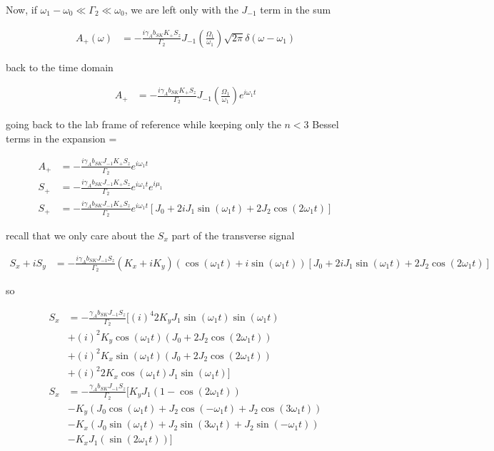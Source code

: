 \documentclass{article}
\begin{document}
Now, if $\omega_1-\omega_0\ll\Gamma_2\ll\omega_0$, we are left only with the $J_{-1}$ term in the sum

\begin{align}
      A_+\left(\omega\right)&= -\frac{i \gamma_{A}b_{SK}K_+ S_z}{\Gamma_2} J_{-1}\left(\frac{\Omega_1}{\omega_1}\right)\sqrt{2\pi} \delta\left(\omega - \omega_1\right)
\end{align}

back to the time domain

\begin{align}
      A_+ &= -\frac{i \gamma_{A}b_{SK}K_+ S_z}{\Gamma_2} J_{-1}\left(\frac{\Omega_1}{\omega_1}\right)e^{i\omega_1 t}
\end{align}

going back to the lab frame of reference while keeping only the $n<3$ Bessel terms in the expansion =

\begin{align}
      A_+ &= -\frac{i \gamma_{A}b_{SK}J_{-1}K_+ S_z}{\Gamma_2} e^{i\omega_1 t}\\
      S_+ &= -\frac{i \gamma_{A}b_{SK}J_{-1}K_+ S_z}{\Gamma_2}e^{i\omega_1 t}e^{i\mu_1}\\
      S_+ &= -\frac{i \gamma_{A}b_{SK}J_{-1}K_+ S_z}{\Gamma_2}e^{i\omega_1 t}\left[J_0+ 2i J_{1}\sin{\left(\omega_1 t\right)}+2 J_{2}\cos{\left(2\omega_1 t\right)}\right]
\end{align}

recall that we only care about the $S_x$ part of the transverse signal 

\begin{align}
      S_x  +i S_y &= -\frac{i \gamma_{A}b_{SK}J_{-1} S_z}{\Gamma_2}\left(K_x+i K_y\right)\left(\cos{(\omega_1 t)}+i\sin{(\omega_1 t)}\right)\left[J_0+ 2i J_{1}\sin{\left(\omega_1 t\right)}+2 J_{2}\cos{\left(2\omega_1 t\right)}\right]\label{eq:transverse_alkali_lab_frame}
\end{align}

so 

\begin{align}
      S_x &= -\frac{\gamma_{A}b_{SK}J_{-1} S_z}{\Gamma_2} \Bigg[(i)^4 2K_y J_{1}\sin{(\omega_1 t)}\sin{\left(\omega_1 t\right)}\\
      &+ (i)^2 K_y\cos{(\omega_1 t)}\left(J_0+ 2 J_{2}\cos{\left(2\omega_1 t\right)}\right)\\
      &+ (i)^2 K_x \sin{(\omega_1 t)}\left(J_0+ 2 J_{2}\cos{\left(2\omega_1 t\right)}\right)\\
      &+ (i)^2 2K_x\cos{(\omega_1 t)}J_{1}\sin{\left(\omega_1 t\right)}\Bigg]\\
      S_x &= -\frac{\gamma_{A}b_{SK}J_{-1} S_z}{\Gamma_2} \Bigg[ K_y J_{1}\left(1 - \cos{\left(2\omega_1 t\right)}\right)\\
      &-  K_y\left(J_0\cos{(\omega_1 t)}+  J_{2}\cos{(-\omega_1 t)}+J_{2}\cos{(3\omega_1 t)}\right)\\
      &-  K_x\left(J_0 \sin{(\omega_1 t)}+ J_{2} \sin{(3\omega_1 t)}+ J_{2} \sin{(-\omega_1 t)}\right)\\
      &- K_x J_{1}\left(\sin{\left(2\omega_1 t\right)}\right)\Bigg]
\end{align}
\end{document}
